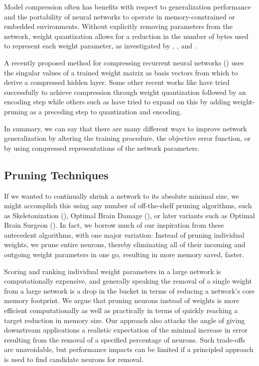 Model compression often has benefits with respect to generalization performance and the portability of neural networks to operate in memory-constrained or embedded environments. Without explicitly removing parameters from the network, weight quantization allows for a reduction in the number of bytes used to represent each weight parameter, as investigated by \cite{balzer1991weight}, \cite{dundar1994effects}, and \cite{hoehfeld1992learning}. 

A recently proposed method for compressing recurrent neural networks (\cite{prabhavalkar2016compression}) uses the singular values of a trained weight matrix as basis vectors from which to derive a compressed hidden layer. Some other recent works like \cite{Anders2016quant} have tried successfully to achieve compression through weight quantization followed by an encoding step while others such as \cite{deepcompression2016} have tried to expand on this by adding weight-pruning as a preceding step to quantization and encoding. 

In summary, we can say that there are many different ways to improve network generalization by altering the training procedure, the objective error function, or by using compressed representations of the network parameters.

\subsection{Pruning Techniques}

If we wanted to continually shrink a network to its absolute minimal size, we might accomplish this using any number of off-the-shelf pruning algorithms, such as Skeletonization (\cite{mozer1989skeletonization}), Optimal Brain Damage (\cite{lecun1989optimal}), or later variants such as Optimal Brain Surgeon (\cite{hassibi1993second}). In fact, we borrow much of our inspiration from these antecedent algorithms, with one major variation: Instead of pruning individual weights, we prune entire neurons, thereby eliminating all of their incoming and outgoing weight parameters in one go, resulting in more memory saved, faster.

Scoring and ranking individual weight parameters in a large network is computationally expensive, and generally speaking the removal of a single weight from a large network is a drop in the bucket in terms of reducing a network's core memory footprint.  We argue that pruning neurons instead of weights is more efficient computationally as well as practically in terms of quickly reaching a target reduction in memory size. Our approach also attacks the angle of giving downstream applications a realistic expectation of the minimal increase in error resulting from the removal of a specified percentage of neurons. Such trade-offs are unavoidable, but performance impacts can be limited if a principled approach is used to find candidate neurons for removal. 

